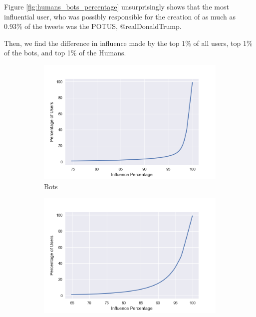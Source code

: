 \documentclass[letterpaper]{article}
\begin{document}
Figure \ref{fig:humans_bots_percentage} unsurprisingly shows that the most influential user, who was possibly responsible for the creation of as much as 0.93\%
of the tweets was the POTUS, @realDonaldTrump.\par

Then, we find the difference in influence made by the top 1\% of all users, top 1\% of the bots, and top 1\% of the Humans. 

\begin{figure}
    \centering
    \captionsetup{justification=centering}

    \begin{subfigure}[b]{0.4\linewidth}
      \includegraphics[width=\linewidth]{images/top_1per_bots.png}
      \caption{Bots}
    \end{subfigure}
    \begin{subfigure}[b]{0.4\linewidth}
      \includegraphics[width=\linewidth]{images/top_1per_humans.png}

\end{subfigure}
\end{figure}
\end{document}
